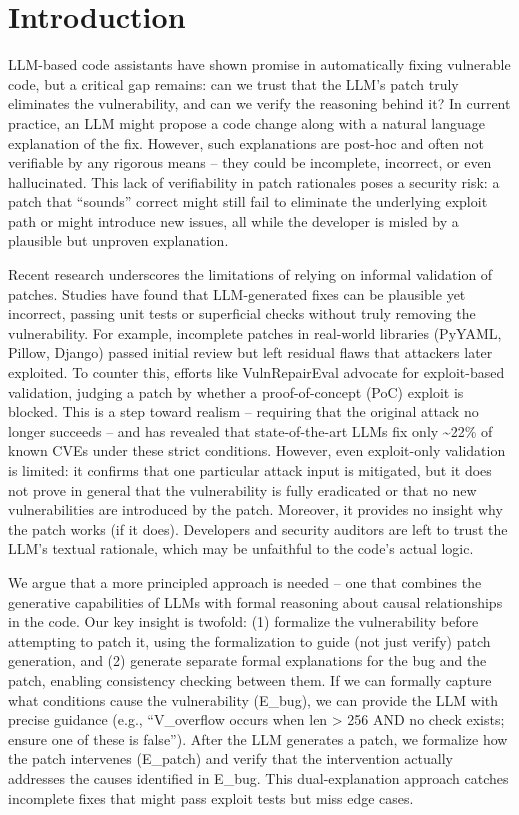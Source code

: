 \documentclass[conference,compsoc]{IEEEtran}
\begin{document}
\section{Introduction}\label{introduction}

LLM-based code assistants have shown promise in automatically fixing
vulnerable code, but a critical gap remains: can we trust that the LLM's
patch truly eliminates the vulnerability, and can we verify the
reasoning behind it? In current practice, an LLM might propose a code
change along with a natural language explanation of the fix. However,
such explanations are post-hoc and often not verifiable by any rigorous
means -- they could be incomplete, incorrect, or even hallucinated. This
lack of verifiability in patch rationales poses a security risk: a patch
that ``sounds'' correct might still fail to eliminate the underlying
exploit path or might introduce new issues, all while the developer is
misled by a plausible but unproven explanation.

Recent research underscores the limitations of relying on informal
validation of patches. Studies have found that LLM-generated fixes can
be plausible yet incorrect, passing unit tests or superficial checks
without truly removing the vulnerability. For example, incomplete
patches in real-world libraries (PyYAML, Pillow, Django) passed initial
review but left residual flaws that attackers later exploited. To
counter this, efforts like VulnRepairEval advocate for exploit-based
validation, judging a patch by whether a proof-of-concept (PoC) exploit
is blocked. This is a step toward realism -- requiring that the original
attack no longer succeeds -- and has revealed that state-of-the-art LLMs
fix only \textasciitilde22\% of known CVEs under these strict
conditions. However, even exploit-only validation is limited: it
confirms that one particular attack input is mitigated, but it does not
prove in general that the vulnerability is fully eradicated or that no
new vulnerabilities are introduced by the patch. Moreover, it provides
no insight why the patch works (if it does). Developers and security
auditors are left to trust the LLM's textual rationale, which may be
unfaithful to the code's actual logic.

We argue that a more principled approach is needed -- one that combines
the generative capabilities of LLMs with formal reasoning about causal
relationships in the code. Our key insight is twofold: (1) formalize the
vulnerability before attempting to patch it, using the formalization to
guide (not just verify) patch generation, and (2) generate separate
formal explanations for the bug and the patch, enabling consistency
checking between them. If we can formally capture what conditions cause
the vulnerability (E\_bug), we can provide the LLM with precise guidance
(e.g., ``V\_overflow occurs when len \textgreater{} 256 AND no check
exists; ensure one of these is false''). After the LLM generates a
patch, we formalize how the patch intervenes (E\_patch) and verify that
the intervention actually addresses the causes identified in E\_bug.
This dual-explanation approach catches incomplete fixes that might pass
exploit tests but miss edge cases.
\end{document}
